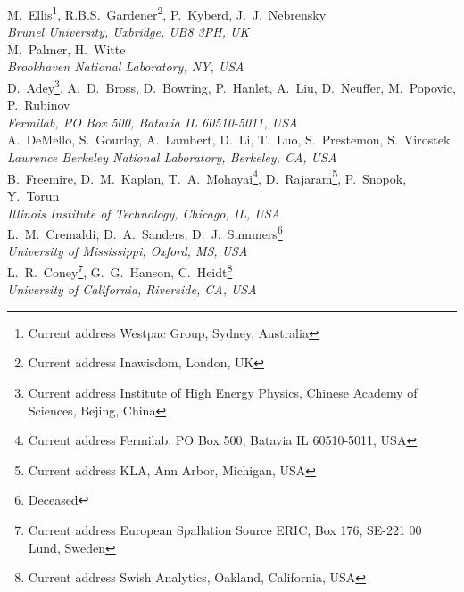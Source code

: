 M.~Ellis\footnote{Current address Westpac Group, Sydney, Australia}, R.B.S.~Gardener\footnote{Current address Inawisdom, London, UK}, P.~Kyberd, J.~J.~Nebrensky
\\{\it
Brunel University, Uxbridge, UB8 3PH, UK
}\\

M.~Palmer, H.~Witte
\\{\it
Brookhaven National Laboratory, NY, USA
}\\

D.~Adey\footnote{Current address Institute of High Energy Physics, Chinese Academy of Sciences, Bejing, China}, A.~D.~Bross, D.~Bowring, P.~Hanlet, A.~Liu\footnotemark{}\setcounter{FNEuclid}{\value{footnote}}, D.~Neuffer, M.~Popovic, P.~Rubinov
\\{\it
Fermilab, PO Box 500, Batavia IL 60510-5011, USA
}\\

A.~DeMello, S.~Gourlay, A.~Lambert, D.~Li, T.~Luo, S.~Prestemon,  S.~Virostek
\\{\it
Lawrence Berkeley National Laboratory, Berkeley, CA, USA
}\\

B.~Freemire\footnotemark[\value{FNEuclid}], D.~M.~Kaplan, T.~A.~Mohayai\footnote{Current address Fermilab, PO Box 500, Batavia IL 60510-5011, USA}, D.~Rajaram\footnote{Current address KLA, Ann Arbor, Michigan, USA}, P.~Snopok, Y.~Torun
\\{\it
Illinois Institute of Technology, Chicago, IL, USA
}\\

L.~M.~Cremaldi, D.~A.~Sanders, D.~J.~Summers\footnote{Deceased}
\\{\it
University of Mississippi, Oxford, MS, USA
}\\

L.~R.~Coney\footnote{Current address European Spallation Source ERIC, Box 176, SE-221 00 Lund, Sweden}, G.~G.~Hanson, C.~Heidt\footnote{Current address Swish Analytics, Oakland, California, USA}
\\{\it
University of California, Riverside, CA, USA
}\\
